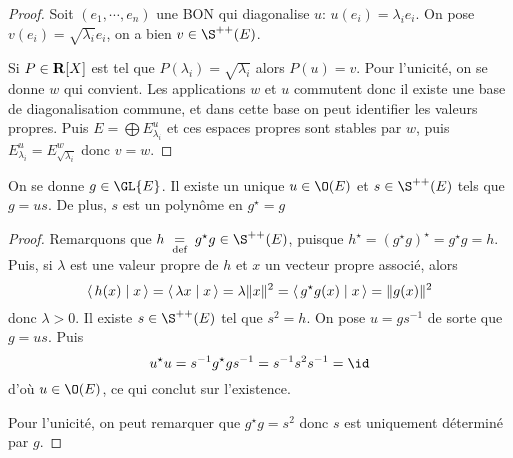 \begin{proof}
    Soit $(e_1, \cdots , e_n)$ une BON qui diagonalise $u$:  $ u(e_i)=\lambda_i e_i$. On pose $v(e_i)=\sqrt{\lambda_i}e_i$, on a bien  $v \in  \S ^{++}(E)$.

    Si $P \in  \mathbf R[X]$ est tel que $P(\lambda_i)=\sqrt{\lambda_i}$ alors  $P(u)=v$. Pour l'unicité, on se donne  $w$ qui convient. Les applications  $w$ et  $u$ commutent donc il existe une base de diagonalisation commune, et dans cette base on peut identifier les valeurs propres. Puis  $E=\bigoplus E_{\lambda_i}^u$ et  ces espaces propres sont stables par  $w$, puis  $E_{\lambda_i}^u=E_{\sqrt{\lambda_i}}^w$ donc  $v=w$.
\end{proof}

\begin{thm}
    On se donne $g \in  \GL{E}$. Il existe un unique $u \in  \O(E)$ et $s \in  \S ^{++}(E)$ tels que $g=us$. De plus,  $s$ est un polynôme en  $g^\star=g$
\end{thm}

\begin{proof}
    Remarquons que $h\defeq g^\star g \in  \S ^{++}(E)$, puisque $h^\star=(g^\star g)^\star=g^\star g=h$. Puis, si  $\lambda$ est une valeur propre de  $h$ et  $x$ un vecteur propre associé, alors  \[
        \scalar{h(x)}{x} = \scalar{\lambda x}{x} = \lambda \|x\|^2 = \scalar{g^\star g (x)}{x} = \|g(x)\|^2 
    \] 
    donc $ \lambda >0$. Il existe $s \in \S^{ ++ }(E)$ tel que $s^2 =h$. On pose $u=gs^{-1}$ de sorte que $g=us$. Puis  \[
    u^\star u=s^{-1}g^\star g s^{-1}=s ^{-1} s^2 s ^{-1}=\id
    \] 
    d'où $u \in  \O(E)$, ce qui conclut sur l'existence.

    Pour l'unicité, on peut remarquer que $g^\star g=s^2$ donc  $s$ est uniquement déterminé par  $g$.
\end{proof}

